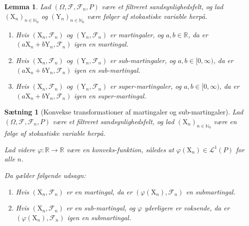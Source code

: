 \documentclass{article}
\newcommand{\1}{\mathbbm{1}}
\theoremstyle{boxed}
\newtheorem{lemma}[theorem]{Lemma}
\newtheorem{proposition}[theorem]{Sætning}
\begin{document}
\begin{theorem-box}
    \begin{lemma}
        Lad $\left(\Omega, \mathcal{F}, \mathcal{F}_n, P\right)$ være et filtreret sandsynlighedsfelt, og lad $\left(\mathrm{X}_n\right)_{n \in \mathbb{N}_0}$ og $\left(\mathrm{Y}_n\right)_{n \in \mathbb{N}_0}$ være følger af stokastiske variable herpå.
\begin{enumerate}
    \item[\textnormal{(i)}]  Hvis $\left(\mathrm{X}_n, \mathcal{F}_n\right)$ og $\left(\mathrm{Y}_n, \mathcal{F}_n\right)$ er martingaler, og $a, b \in \mathbb{R}$, da er $\left(a \mathrm{X}_n+b \mathrm{Y}_n, \mathcal{F}_n\right)$ igen en martingal.
    \item[\textnormal{(ii)}] Hvis $\left(\mathrm{X}_n, \mathcal{F}_n\right)$ og $\left(\mathrm{Y}_n, \mathcal{F}_n\right)$ er sub-martingaler, og $a, b \in[0, \infty)$, da er $\left(a \mathrm{X}_n+b \mathrm{Y}_n, \mathcal{F}_n\right)$ igen en sub-martingal.
    \item[\textnormal{(iii)}] Hvis $\left(\mathrm{X}_n, \mathcal{F}_n\right)$ og $\left(\mathrm{Y}_n, \mathcal{F}_n\right)$ er super-martingaler, og $a, b \in[0, \infty)$, da er $\left(a \mathrm{X}_n+b \mathrm{Y}_n, \mathcal{F}_n\right)$ igen en super-martingal.
\end{enumerate}
    \end{lemma}
\end{theorem-box}
\begin{theorem-box}
    \begin{proposition}[Konvekse transformationer af martingaler og sub-martingaler]
        Lad $\left(\Omega, \mathcal{F}, \mathcal{F}_n, P\right)$ være et filtreret sandsynlighedsfelt, og lad $\left(\mathrm{X}_n\right)_{n \in \mathbb{N}_0}$ være en følge af stokastiske variable herpå.

Lad videre $\varphi: \mathbb{R} \rightarrow \mathbb{R}$ være en konveks-funktion, således at $\varphi\left(\mathrm{X}_n\right) \in \mathcal{L}^1(P)$ for alle $n$.

Da gælder følgende udsagn:
\begin{enumerate}
    \item[\textnormal{(i)}] Hvis $\left(\mathrm{X}_n, \mathcal{F}_n\right)$ er en martingal, da er $\left(\varphi\left(\mathrm{X}_n\right), \mathcal{F}_n\right)$ en submartingal.
    \item[\textnormal{(ii)}] Hvis $\left(\mathrm{X}_n, \mathcal{F}_n\right)$ er en sub-martingal, og $\varphi$ yderligere er voksende, da er $\left(\varphi\left(\mathrm{X}_n\right), \mathcal{F}_n\right)$ igen en submartingal.
\end{enumerate}
    \end{proposition}
\end{theorem-box}
\end{document}
